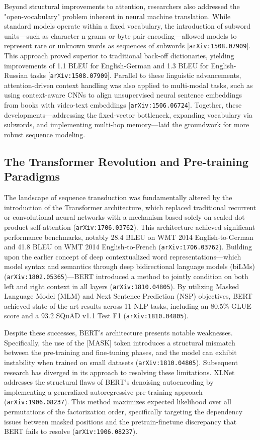 \documentclass[11pt]{article}
\begin{document}
Beyond structural improvements to attention, researchers also addressed the "open-vocabulary" problem inherent in neural machine translation. While standard models operate within a fixed vocabulary, the introduction of subword units—such as character n-grams or byte pair encoding—allowed models to represent rare or unknown words as sequences of subwords [\texttt{arXiv:1508.07909}]. This approach proved superior to traditional back-off dictionaries, yielding improvements of 1.1 BLEU for English-German and 1.3 BLEU for English-Russian tasks [\texttt{arXiv:1508.07909}]. Parallel to these linguistic advancements, attention-driven context handling was also applied to multi-modal tasks, such as using context-aware CNNs to align unsupervised neural sentence embeddings from books with video-text embeddings [\texttt{arXiv:1506.06724}]. Together, these developments—addressing the fixed-vector bottleneck, expanding vocabulary via subwords, and implementing multi-hop memory—laid the groundwork for more robust sequence modeling.

\subsection{The Transformer Revolution and Pre-training Paradigms}

The landscape of sequence transduction was fundamentally altered by the introduction of the Transformer architecture, which replaced traditional recurrent or convolutional neural networks with a mechanism based solely on scaled dot-product self-attention (\texttt{arXiv:1706.03762}). This architecture achieved significant performance benchmarks, notably 28.4 BLEU on WMT 2014 English-to-German and 41.8 BLEU on WMT 2014 English-to-French (\texttt{arXiv:1706.03762}). Building upon the earlier concept of deep contextualized word representations—which model syntax and semantics through deep bidirectional language models (biLMs) (\texttt{arXiv:1802.05365})—BERT introduced a method to jointly condition on both left and right context in all layers (\texttt{arXiv:1810.04805}). By utilizing Masked Language Model (MLM) and Next Sentence Prediction (NSP) objectives, BERT achieved state-of-the-art results across 11 NLP tasks, including an 80.5\% GLUE score and a 93.2 SQuAD v1.1 Test F1 (\texttt{arXiv:1810.04805}).

Despite these successes, BERT's architecture presents notable weaknesses. Specifically, the use of the [MASK] token introduces a structural mismatch between the pre-training and fine-tuning phases, and the model can exhibit instability when trained on small datasets (\texttt{arXiv:1810.04805}). Subsequent research has diverged in its approach to resolving these limitations. XLNet addresses the structural flaws of BERT’s denoising autoencoding by implementing a generalized autoregressive pre-training approach (\texttt{arXiv:1906.08237}). This method maximizes expected likelihood over all permutations of the factorization order, specifically targeting the dependency issues between masked positions and the pretrain-finetune discrepancy that BERT fails to resolve (\texttt{arXiv:1906.08237}).
\end{document}
